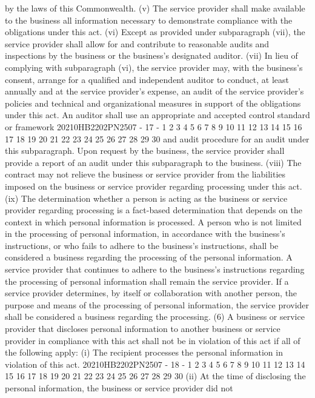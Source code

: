 by the laws of this Commonwealth.
(v) The service provider shall make available to the
business all information necessary to demonstrate
compliance with the obligations under this act.
(vi) Except as provided under subparagraph (vii),
the service provider shall allow for and contribute to
reasonable audits and inspections by the business or the
business's designated auditor.
(vii) In lieu of complying with subparagraph (vi),
the service provider may, with the business's consent,
arrange for a qualified and independent auditor to
conduct, at least annually and at the service provider's
expense, an audit of the service provider's policies and
technical and organizational measures in support of the
obligations under this act. An auditor shall use an
appropriate and accepted control standard or framework
20210HB2202PN2507 - 17 -
1
2
3
4
5
6
7
8
9
10
11
12
13
14
15
16
17
18
19
20
21
22
23
24
25
26
27
28
29
30
and audit procedure for an audit under this subparagraph.
Upon request by the business, the service provider shall
provide a report of an audit under this subparagraph to
the business.
(viii) The contract may not relieve the business or
service provider from the liabilities imposed on the
business or service provider regarding processing under
this act.
(ix) The determination whether a person is acting as
the business or service provider regarding processing is
a fact-based determination that depends on the context in
which personal information is processed. A person who is
not limited in the processing of personal information, in
accordance with the business's instructions, or who fails
to adhere to the business's instructions, shall be
considered a business regarding the processing of the
personal information. A service provider that continues
to adhere to the business's instructions regarding the
processing of personal information shall remain the
service provider. If a service provider determines, by
itself or collaboration with another person, the purpose
and means of the processing of personal information, the
service provider shall be considered a business regarding
the processing.
(6) A business or service provider that discloses
personal information to another business or service provider
in compliance with this act shall not be in violation of this
act if all of the following apply:
(i) The recipient processes the personal information
in violation of this act.
20210HB2202PN2507 - 18 -
1
2
3
4
5
6
7
8
9
10
11
12
13
14
15
16
17
18
19
20
21
22
23
24
25
26
27
28
29
30
(ii) At the time of disclosing the personal
information, the business or service provider did not

